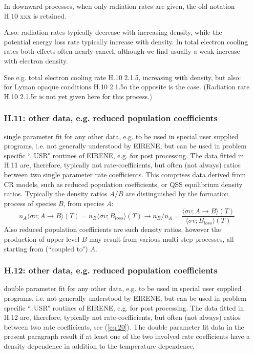 \documentclass[12pt,dvipdfmx]{article}
\begin{document}
In downward processes, when only radiation rates are given, the old notation H.10 xxx is retained.

Also:  radiation rates typically decrease with increasing density, while the potential energy loss rate
typically increase with density. In total electron cooling rates both effects often nearly cancel,
although we find usually a weak increase with electron density.

See e.g. total electron cooling rate H.10 2.1.5, increasing with density, but also: for Lyman opaque
conditions H.10 2.1.5o the opposite is the case.
(Radiation rate H.10 2.1.5r is not yet given here for this process.)

\newpage
\subsubsection{H.11: other data, e.g. reduced population coefficients}\label{sec1.3.11}
single parameter fit for any other data, e.g.
to be used in special user supplied
programs, i.e. not generally understood by EIRENE, but can be used in problem
specific ``..USR" routines of EIRENE, e.g. for post processing.
The data fitted in H.11 are, therefore, typically not rate-coefficients,
but often (not always) ratios between two single parameter rate coefficients.
This comprises data derived from CR models, such as reduced population coefficients, or
QSS equilibrium density ratios.
Typically the density ratios $A/B$ are distinguished by the formation process
of species $B$, from species $A$:
\begin{equation}\label{eq.20}
n_A \langle \sigma v; A \rightarrow B\rangle(T)  = n_B \langle \sigma v; B_{loss}\rangle(T)    \rightarrow n_B/n_A = \frac{\langle \sigma v; A \rightarrow B\rangle(T)}{\langle \sigma v; B_{loss}\rangle(T)}
\end{equation}
Also reduced population coefficients are such density ratios, however the production of upper level $B$
may result from various multi-step processes, all starting from  (``coupled to") $A$.
\subsubsection{H.12: other data, e.g. reduced population coefficients}\label{sec1.3.12}
double parameter fit for any other data, e.g.
to be used in special user supplied
programs, i.e. not generally understood by EIRENE, but can be used in problem
specific ``..USR" routines of EIRENE, e.g. for post processing.
The data fitted in H.12 are, therefore, typically not rate-coefficients,
but often (not always) ratios between two rate coefficients, see (\ref{eq.20}).
The double parameter fit data in the present paragraph result if at least one of the two
involved rate coefficients have a density dependence in addition to the temperature dependence.
\end{document}
